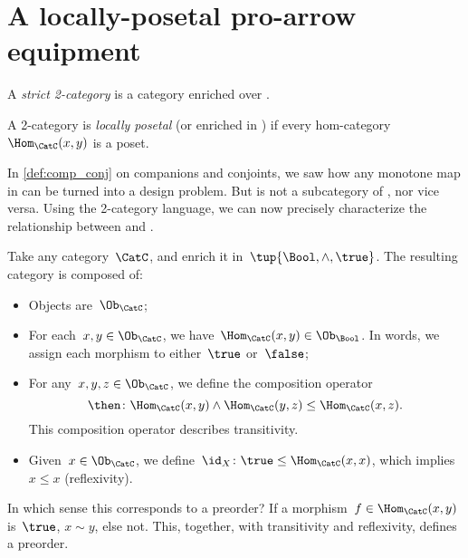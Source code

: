 
\section{A locally-posetal pro-arrow equipment}

\begin{definition}[2-category]
    A \emph{strict 2-category} is a category enriched over \Category.
\end{definition}

\begin{definition}
    \label{def:locallyposetalcat}
    A 2-category \CatC is \emph{locally posetal} (or enriched in \Pos) if every hom-category~$\Hom_{\CatC}(x,y)$ is a poset.
\end{definition}
In \cref{def:comp_conj} on companions and conjoints, we saw how any monotone map in \Pos can be turned into a design problem. But \DP is not a subcategory of \Pos, nor vice versa. Using the 2-category language, we can now precisely characterize the relationship between \Pos and \DP. %

\begin{example}
    Take any category~$\CatC$, and enrich it in~$\tup{\Bool,\wedge,\true}$. The resulting category is composed of:
    \begin{itemize}
        \item Objects are~$\Ob_\CatC$;
        \item For each~$x,y\in \Ob_\CatC$, we have~$\Hom_\CatC(x,y)\in \Ob_\Bool$. In words, we assign each morphism to either~$\true$ or~$\false$;
        \item For any~$x,y,z\in \Ob_\CatC$, we define the composition operator
        \begin{equation*}
            \then \colon \Hom_\CatC(x,y)\wedge \Hom_\CatC(y,z)\leq \Hom_\CatC(x,z).
        \end{equation*}
        This composition operator describes transitivity.
        \item Given~$x\in \Ob_\CatC$, we define~$\id_X\colon \true \leq \Hom_\CatC(x,x)$, which implies~$x\leq x$ (reflexivity).
    \end{itemize}
    In which sense this corresponds to a preorder? If a morphism~$f\in \Hom_\CatC(x,y)$ is~$\true$, $x\sim y$, else not. This, together, with transitivity and reflexivity, defines a preorder.
\end{example}

